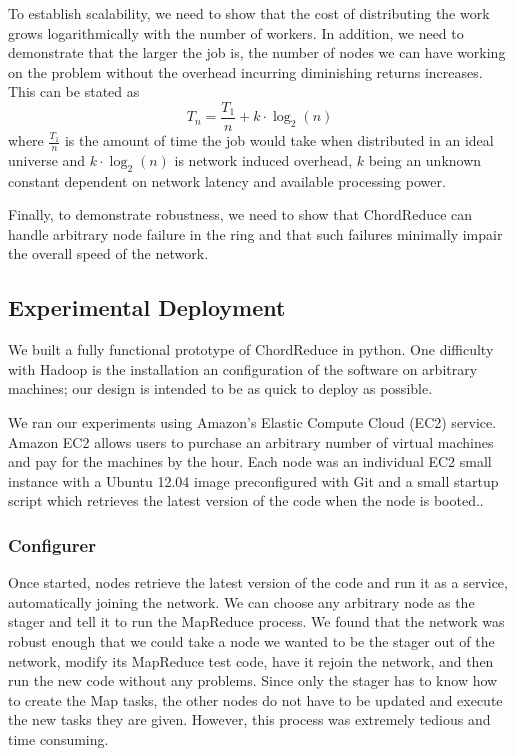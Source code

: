 \documentclass[10pt, conference, compsocconf]{IEEEtran}
\begin{document}
To establish scalability, we need to show that the cost of distributing the work grows logarithmically with the number of workers.  In addition, we need to demonstrate that the larger the job is, the number of nodes we can have working on the problem without the overhead incurring diminishing returns increases. This can be stated as $$T_{n} = \frac{T_{1}}{n} + k \cdot \log_{2}(n)$$ where $\frac{T_{1}}{n}$ is the amount of time the job would take when distributed in an ideal universe and $k \cdot \log_{2}(n)$ is network induced overhead, $k$ being an unknown constant dependent on network latency and available processing power.

Finally, to demonstrate robustness, we need to show that ChordReduce can handle arbitrary node failure in the ring and that such failures minimally impair the overall speed of the network.

\subsection{Experimental Deployment}
We built a fully functional prototype of ChordReduce in python.  One difficulty with Hadoop is the installation an configuration of the software on arbitrary machines;  our design is intended to be as quick to deploy as possible. 


We ran our experiments using Amazon's Elastic Compute Cloud (EC2) service.  Amazon EC2 allows users to purchase an arbitrary number of virtual machines and pay for the machines by the hour. Each node was an individual EC2 small instance \cite{amazon-instances} with a Ubuntu 12.04 image preconfigured with Git and a small startup script which retrieves the latest version of the code when the node is booted..  

\subsubsection*{Configurer}
Once started, nodes retrieve the latest version of the code and run it as a service, automatically joining the network.  We can choose any arbitrary node as the stager and tell it to run the MapReduce process. We found that the network was robust enough that we could take a node we wanted to be the stager out of the network, modify its MapReduce test code, have it rejoin the network, and then run the new code without any problems. Since only the stager has to know how to create the Map tasks, the other nodes do not have to be updated and execute the new tasks they are given.  However, this process was extremely tedious and time consuming.
\end{document}
